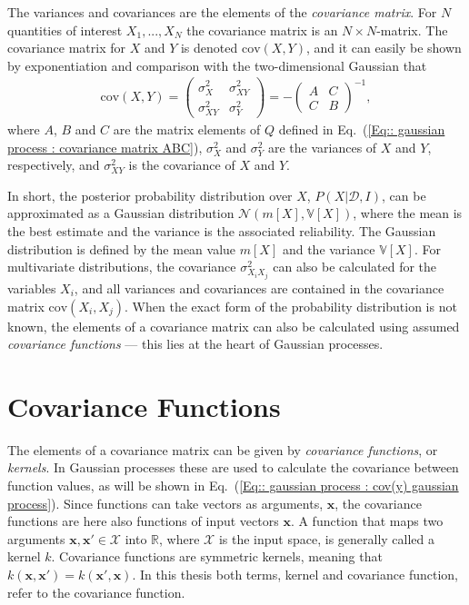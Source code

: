 \documentclass[twoside,english]{uiofysmaster}
\begin{document}
{{The variances and covariances are the elements of the \textit{covariance matrix}. For $N$ quantities of interest $X_1, ...,X_N$ the covariance matrix is an $N \times N$-matrix. The covariance matrix for $X$ and $Y$ is denoted $\text{cov}(X,Y)$, and it can easily be shown by exponentiation and comparison with the two-dimensional Gaussian that \cite{sivia2006data}
\begin{align}
\text{cov}(X,Y) = 
\begin{pmatrix}
\sigma_X^2 & \sigma_{XY}^2\\
\sigma_{XY}^2 & \sigma_Y^2
\end{pmatrix}
= - \begin{pmatrix}
A & C\\
C & B
\end{pmatrix}^{-1},
\end{align}
where $A$, $B$ and $C$ are the matrix elements of $Q$ defined in Eq.~(\ref{Eq:: gaussian process : covariance matrix ABC}),  $\sigma_X^2$ and $\sigma_Y^2$ are the variances of $X$ and $Y$, respectively, and $\sigma_{XY}^2$ is the covariance of $X$ and $Y$.

In short, the posterior probability distribution over $X$, $P(X | \mathcal{D}, I)$, can be approximated as a Gaussian distribution $\mathcal{N}(m[X], \mathbb{V}[X])$, where the mean is the best estimate and the variance is the associated reliability. The Gaussian distribution is defined by the mean value $m[X]$ and the variance $\mathbb{V}[X]$. For multivariate distributions, the covariance $\sigma_{X_i X_j}^2$ can also be calculated for the variables $X_i$, and all variances and covariances are contained in the covariance matrix $\text{cov}(X_i, X_j)$. When the exact form of the probability distribution is not known, the elements of a covariance matrix can also be calculated using assumed \textit{covariance functions} --- this lies at the heart of Gaussian processes.



\section{Covariance Functions}\label{Sec:: gaussian processes : Covariance functions}


The elements of a covariance matrix can be given by \textit{covariance functions}, or \textit{kernels}. In Gaussian processes these are used to calculate the covariance between function values, as will be shown in Eq.~(\ref{Eq:: gaussian process : cov(y) gaussian process}). Since functions can take vectors as arguments, $\textbf{x}$, the covariance functions are here also functions of input vectors $\textbf{x}$. A function that maps two arguments $\textbf{x},\textbf{x}' \in \mathcal{X}$ into $\mathbb{R}$, where $\mathcal{X}$ is the input space, is generally called a kernel $k$. Covariance functions are symmetric kernels, meaning that $k(\textbf{x}, \textbf{x}') = k(\textbf{x}', \textbf{x})$. In this thesis both terms, kernel and covariance function, refer to the covariance function. 


}}
\end{document}
